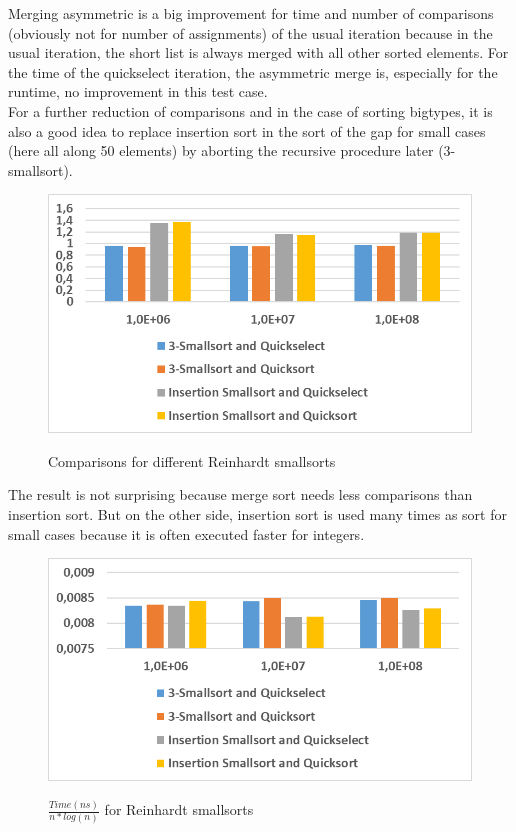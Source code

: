 \documentclass[11pt,pdftex,a4paper, twocolumn]{article}
\begin{document}
Merging asymmetric is a big improvement for time and number of comparisons (obviously not for number of assignments) of the usual iteration because in the usual iteration, the short list is always merged with all other sorted elements. For the time of the quickselect iteration, the asymmetric merge is, especially for the runtime, no improvement in this test case. \\
For a further reduction of comparisons and in the case of sorting bigtypes, it is also a good idea to replace insertion sort in the sort of the gap for small cases (here all along 50 elements) by aborting the recursive procedure later (3-smallsort). \\
\begin{figure}[H]
\includegraphics[width=\linewidth]{Diagramm-Bilder/comparisons-diff-iter-and-smallsorts.JPG} \\
\caption{Comparisons for different Reinhardt smallsorts} \label{fig:comparisons-diff-iter-and-smallsorts}
\end{figure}
The result is not surprising because merge sort needs less comparisons than insertion sort. But on the other side, insertion sort is used many times as sort for small cases because it is often executed faster for integers. \\
\begin{figure}[H]
\includegraphics[width=\linewidth]{Diagramm-Bilder/time-diff-iter-and-smallsorts.JPG} \\
\caption{ $ \frac{Time(ns)}{n*log(n)} $ for Reinhardt smallsorts} \label{fig:time-diff-iter-and-smallsorts}
\end{figure}
\end{document}
